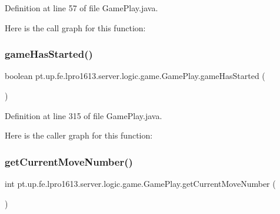 Definition at line 57 of file Game\+Play.\+java.

Here is the call graph for this function\+:
\hypertarget{classpt_1_1up_1_1fe_1_1lpro1613_1_1server_1_1logic_1_1game_1_1_game_play_add9e9aabd2a8cc2a7292c07da1f78633}{}\label{classpt_1_1up_1_1fe_1_1lpro1613_1_1server_1_1logic_1_1game_1_1_game_play_add9e9aabd2a8cc2a7292c07da1f78633} 
\subsubsection{\texorpdfstring{game\+Has\+Started()}{gameHasStarted()}}
{\footnotesize\ttfamily boolean pt.\+up.\+fe.\+lpro1613.\+server.\+logic.\+game.\+Game\+Play.\+game\+Has\+Started (\begin{DoxyParamCaption}{ }\end{DoxyParamCaption})}



Definition at line 315 of file Game\+Play.\+java.

Here is the caller graph for this function\+:
\hypertarget{classpt_1_1up_1_1fe_1_1lpro1613_1_1server_1_1logic_1_1game_1_1_game_play_a11a46b9f496810e0d145462ffd23843b}{}\label{classpt_1_1up_1_1fe_1_1lpro1613_1_1server_1_1logic_1_1game_1_1_game_play_a11a46b9f496810e0d145462ffd23843b} 
\subsubsection{\texorpdfstring{get\+Current\+Move\+Number()}{getCurrentMoveNumber()}}
{\footnotesize\ttfamily int pt.\+up.\+fe.\+lpro1613.\+server.\+logic.\+game.\+Game\+Play.\+get\+Current\+Move\+Number (\begin{DoxyParamCaption}{ }\end{DoxyParamCaption})}




